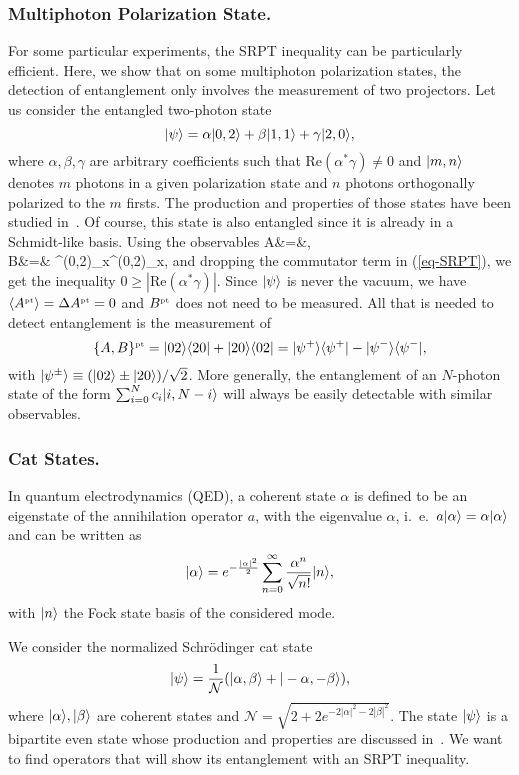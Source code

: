 \subsubsection{Multiphoton Polarization State.}

For some particular experiments, the SRPT inequality can be particularly efficient. Here, we show that on some multiphoton polarization states, the detection of entanglement only involves the measurement of two projectors. Let us consider the entangled two-photon state
\[ | \psi \rangle = \alpha | 0,2 \rangle + \beta | 1,1 \rangle + \gamma | 2,0 \rangle, \label{eq-multi} \]
where $\alpha, \beta, \gamma$ are arbitrary coefficients such that $ \mbox{Re}(\alpha^* \gamma)\neq 0$ and $| m,n \rangle$ denotes $m$ photons in a given polarization state and $n$ photons orthogonally polarized to the $m$ firsts. The production and properties of those states have been studied in~\cite{Tse00}.  Of course, this state is also entangled since it is already in a Schmidt-like basis. Using the observables
\bea  A&=&, \\  B&=& \sigma^{(0,2)}_x\otimes\sigma^{(0,2)}_x, \eea
and dropping the commutator term in (\ref{eq-SRPT}), we get the inequality $0 \ge | \mbox{Re}(\alpha^* \gamma)|$. Since $| \psi \rangle$ is never the vacuum, we have $\langle A^{\mbox{\tiny \textup{pt}}} \rangle = \Delta A^{\mbox{\tiny \textup{pt}}} = 0$ and $B^{\mbox{\tiny \textup{pt}}}$ does not need to be measured. All that is needed to detect entanglement is the measurement of  
\[ \{A,B\}^{\mbox{\tiny \textup{pt}}}= | 02 \rangle \langle 20 |+| 20 \rangle \langle 02 | = | \psi^+ \rangle \langle \psi^+ |-| \psi^- \rangle \langle \psi^- |, \] 
with $| \psi^\pm \rangle\equiv (| 02 \rangle \pm | 20 \rangle)/\sqrt 2$. More generally, the entanglement of an $N$-photon state of the form $\sum_{i=0}^N c_i | i,N-i  \rangle$  will always be easily detectable with similar observables.

\subsubsection{Cat States.} 

In quantum electrodynamics (QED), a coherent state $\alpha$ is defined to be an eigenstate of the annihilation operator $a$, with the eigenvalue $\alpha$, i.~e.~$a | \alpha \rangle=\alpha| \alpha \rangle$ and can be written as
 \[ | \alpha \rangle =e^{-\frac{|\alpha|^2}{2}}\sum_{n=0}^{\infty} \frac{\alpha^n}{\sqrt{n!}} | n \rangle, \]
 with $| n \rangle$ the Fock state basis of the considered mode.

We consider the normalized Schr\"odinger cat state 
\[ | \psi \rangle= \frac{1}{\mathcal{N}} (| \alpha, \beta \rangle + | -\alpha,-\beta \rangle), \label{eq-cat}\]
 where $| \alpha \rangle, | \beta \rangle$ are coherent states and $\mathcal{N}=\sqrt{2+2 e^{-2|\alpha|^2-2|\beta|^2}}$.  
The state $| \psi \rangle$ is a bipartite even state whose production and properties are discussed in~\cite{Ger07}. We want to find operators that will show its entanglement with an SRPT inequality.
 
